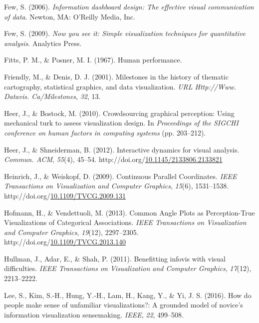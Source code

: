 \documentclass[print]{nuthesis}
\newlength{\cslhangindent}
\newenvironment{CSLReferences}[2]%
{\setlength{\parindent}{0pt}%
\everypar{\setlength{\hangindent}{\cslhangindent}}\ignorespaces}%
{\par}
\begin{document}
\begin{CSLReferences}{1}{0}
\leavevmode{}%
Few, S. (2006). \emph{Information dashboard design: The effective visual communication of data}. Newton, MA: O'Reilly Media, Inc.

\leavevmode{}%
Few, S. (2009). \emph{Now you see it: Simple visualization techniques for quantitative analysis}. Analytics Press.

\leavevmode{}%
Fitts, P. M., \& Posner, M. I. (1967). Human performance.

\leavevmode{}%
Friendly, M., \& Denis, D. J. (2001). Milestones in the history of thematic cartography, statistical graphics, and data visualization. \emph{URL Http://Www. Datavis. Ca/Milestones}, \emph{32}, 13.

\leavevmode{}%
Heer, J., \& Bostock, M. (2010). Crowdsourcing graphical perception: Using mechanical turk to assess visualization design. In \emph{Proceedings of the SIGCHI conference on human factors in computing systems} (pp. 203--212).

\leavevmode{}%
Heer, J., \& Shneiderman, B. (2012). Interactive dynamics for visual analysis. \emph{Commun. ACM}, \emph{55}(4), 45--54. http://doi.org/\href{https://doi.org/10.1145/2133806.2133821}{10.1145/2133806.2133821}

\leavevmode{}%
Heinrich, J., \& Weiskopf, D. (2009). {Continuous Parallel Coordinates}. \emph{IEEE Transactions on Visualization and Computer Graphics}, \emph{15}(6), 1531--1538. http://doi.org/\href{https://doi.org/10.1109/TVCG.2009.131}{10.1109/TVCG.2009.131}

\leavevmode{}%
Hofmann, H., \& Vendettuoli, M. (2013). {Common Angle Plots as Perception-True Visualizations of Categorical Associations}. \emph{IEEE Transactions on Visualization and Computer Graphics}, \emph{19}(12), 2297--2305. http://doi.org/\href{https://doi.org/10.1109/TVCG.2013.140}{10.1109/TVCG.2013.140}

\leavevmode{}%
Hullman, J., Adar, E., \& Shah, P. (2011). Benefitting infovis with visual difficulties. \emph{IEEE Transactions on Visualization and Computer Graphics}, \emph{17}(12), 2213--2222.

\leavevmode{}%
Lee, S., Kim, S.-H., Hung, Y.-H., Lam, H., Kang, Y., \& Yi, J. S. (2016). How do people make sense of unfamiliar visualizations?: A grounded model of novice's information visualization sensemaking. \emph{IEEE}, \emph{22}, 499--508.


\end{CSLReferences}
\end{document}
